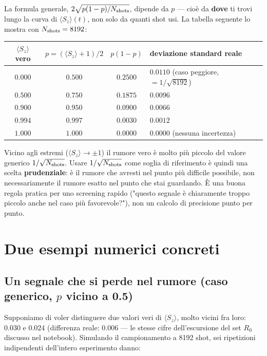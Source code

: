 \documentclass[11pt,a4paper]{article}
\begin{document}
La formula generale, $2\sqrt{p(1-p)/N_{\rm shots}}$, dipende da $p$ ---
cioè da \textbf{dove} ti trovi lungo la curva di
$\langle S_z\rangle(t)$, non solo da quanti shot usi. La tabella
seguente lo mostra con $N_{\rm shots}=8192$:

\begin{center}
\renewcommand{\arraystretch}{1.25}
\begin{tabular}{@{}cccl@{}}
\toprule
\rowcolor{inkblue!10}
$\langle S_z\rangle$ vero & $p=(\langle S_z\rangle+1)/2$ & $p(1-p)$ & deviazione standard reale\\
\midrule
$0.000$ & $0.500$ & $0.2500$ & $0.0110$ (caso peggiore, $=1/\sqrt{8192}$)\\
$0.500$ & $0.750$ & $0.1875$ & $0.0096$\\
$0.900$ & $0.950$ & $0.0900$ & $0.0066$\\
$0.994$ & $0.997$ & $0.0030$ & $0.0012$\\
$1.000$ & $1.000$ & $0.0000$ & $0.0000$ (nessuna incertezza)\\
\bottomrule
\end{tabular}
\end{center}

\begin{editnote}
Vicino agli estremi ($\langle S_z\rangle\to\pm1$) il rumore vero è
molto più piccolo del valore generico $1/\sqrt{N_{\rm shots}}$. Usare
$1/\sqrt{N_{\rm shots}}$ come soglia di riferimento è quindi una scelta
\textbf{prudenziale}: è il rumore che avresti nel punto più difficile
possibile, non necessariamente il rumore esatto nel punto che stai
guardando. È una buona regola pratica per uno screening rapido
("questo segnale è chiaramente troppo piccolo anche nel caso più
favorevole?"), non un calcolo di precisione punto per punto.
\end{editnote}

\section{Due esempi numerici concreti}

\subsection*{Un segnale che si perde nel rumore (caso generico, $p$ vicino a 0.5)}

Supponiamo di voler distinguere due valori veri di $\langle S_z\rangle$,
molto vicini fra loro: $0.030$ e $0.024$ (differenza reale: $0.006$ ---
le stesse cifre dell'escursione del set $R_0$ discusso nel notebook).
Simulando il campionamento a 8192 shot, sei ripetizioni indipendenti
dell'intero esperimento danno:
\end{document}
